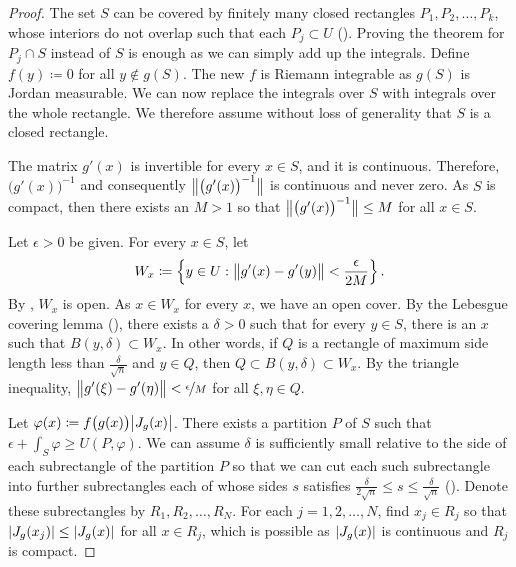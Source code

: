 \begin{proof}
The set $S$ can be covered by finitely many closed rectangles
$P_1,P_2,\ldots,P_k$, whose
interiors do not overlap such that each $P_j \subset U$
().
Proving the theorem for $P_j \cap S$ instead of $S$ is enough
as we can simply add up the integrals.
Define $f(y) \coloneqq 0$ for all $y \notin g(S)$.
The new $f$ is Riemann integrable as $g(S)$ is Jordan measurable.
We can now replace the integrals over $S$ with integrals over the whole
rectangle.
We therefore assume without loss of generality that $S$ is a closed rectangle.

The matrix $g'(x)$ is invertible for every $x \in S$,
and it is continuous.  Therefore, ${\bigl(g'(x)\bigr)}^{-1}$
and consequently 
$\bigl\lVert {{\bigl(g'(x)\bigr)}^{-1}} \bigr\rVert$ is continuous and never zero.
As $S$ is compact, then there exists an $M > 1$ so that
$\bigl\lVert {{\bigl(g'(x)\bigr)}^{-1}} \bigr\rVert \leq M$ for all $x \in S$.

Let $\epsilon > 0$ be given.
For every $x \in S$, let
\begin{equation*}
W_x \coloneqq
\left\{ y \in U : \bigl\lVert {g'(x)-g'(y)} \bigr\rVert < \frac{\epsilon}{2M} \right\} .
\end{equation*}
By ,
$W_x$ is open.
As $x \in W_x$ for every $x$, we have an open cover.
By the Lebesgue covering lemma
(),
there exists a $\delta > 0$ such that
for every $y \in S$, there is an $x$ such that $B(y,\delta) \subset W_x$.
In other words, if $Q$ is a rectangle of maximum side length less
than $\frac{\delta}{\sqrt{n}}$ and $y \in Q$, then $Q \subset
B(y,\delta) \subset W_x$.  By the triangle inequality,
$\bigl\lVert {g'(\xi)-g'(\eta)} \bigr\rVert < \nicefrac{\epsilon}{M}$ for all $\xi, \eta \in Q$.

Let $\varphi(x) \coloneqq f\bigl(g(x)\bigr) \bigl\lvert {J_g(x)} \bigr\rvert$.
There exists a partition $P$ of $S$ such that
$\epsilon + \int_S \varphi \geq U(P,\varphi)$.
We can assume $\delta$ is sufficiently small relative to the side
of each subrectangle of the partition $P$ so that we can cut each such
subrectangle into further subrectangles each of whose sides $s$ satisfies
$\frac{\delta}{2\sqrt{n}} \leq s \leq \frac{\delta}{\sqrt{n}}$
().
Denote these subrectangles by
$R_1,R_2,\ldots,R_N$.
For each $j=1,2,\dots,N$, find $x_j \in R_j$ so that
$\lvert {J_g(x_j)} \rvert \leq \lvert {J_g(x)} \rvert$ for all $x \in R_j$,
which is possible as $\lvert {J_g(x)} \rvert$ is continuous and $R_j$
is compact.


\end{proof}
